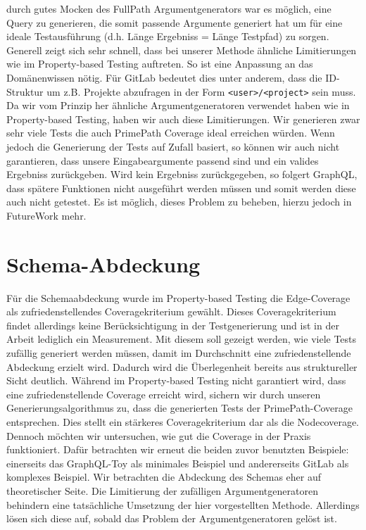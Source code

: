 durch gutes Mocken des FullPath Argumentgenerators war es möglich, eine Query zu generieren, die somit passende Argumente generiert hat
um für eine ideale Testausführung (d.h. Länge Ergebniss = Länge Testpfad) zu sorgen.
Generell zeigt sich sehr schnell, dass bei unserer Methode ähnliche Limitierungen wie im Property-based Testing auftreten.
So ist eine Anpassung an das Domänenwissen nötig.
Für GitLab bedeutet dies unter anderem, dass die ID-Struktur um z.B. Projekte abzufragen in der Form \verb+<user>/<project>+ sein muss. \cite[vgl. S.8]{property-based-testing}
Da wir vom Prinzip her ähnliche Argumentgeneratoren verwendet haben wie in Property-based Testing, haben wir auch diese Limitierungen.
Wir generieren zwar sehr viele Tests die auch PrimePath Coverage ideal erreichen würden.
Wenn jedoch die Generierung der Tests auf Zufall basiert, so können wir auch nicht garantieren, dass unsere Eingabeargumente passend sind und ein valides Ergebniss zurückgeben.
Wird kein Ergebniss zurückgegeben, so folgert GraphQL, dass spätere Funktionen nicht ausgeführt werden müssen und somit werden diese auch nicht getestet.
Es ist möglich, dieses Problem zu beheben, hierzu jedoch in FutureWork mehr.

\section{Schema-Abdeckung}

Für die Schemaabdeckung wurde im Property-based Testing die Edge-Coverage als zufriedenstellendes Coveragekriterium gewählt.
Dieses Coveragekriterium findet allerdings keine Berücksichtigung in der Testgenerierung und ist in der Arbeit lediglich ein Measurement.
Mit diesem soll gezeigt werden, wie viele Tests zufällig generiert werden müssen, damit im Durchschnitt eine zufriedenstellende Abdeckung erzielt wird.
Dadurch wird die Überlegenheit bereits aus struktureller Sicht deutlich.
Während im Property-based Testing nicht garantiert wird, dass eine zufriedenstellende Coverage erreicht wird,
sichern wir durch unseren Generierungsalgorithmus zu, dass die generierten Tests der PrimePath-Coverage entsprechen.
Dies stellt ein stärkeres Coveragekriterium dar als die Nodecoverage.
Dennoch möchten wir untersuchen, wie gut die Coverage in der Praxis funktioniert.
Dafür betrachten wir erneut die beiden zuvor benutzten Beispiele: einerseits das GraphQL-Toy als minimales Beispiel und andererseits GitLab als komplexes Beispiel.
Wir betrachten die Abdeckung des Schemas eher auf theoretischer Seite.
Die Limitierung der zufälligen Argumentgeneratoren behindern eine tatsächliche Umsetzung der hier vorgestellten Methode.
Allerdings lösen sich diese auf, sobald das Problem der Argumentgeneratoren gelöst ist.

